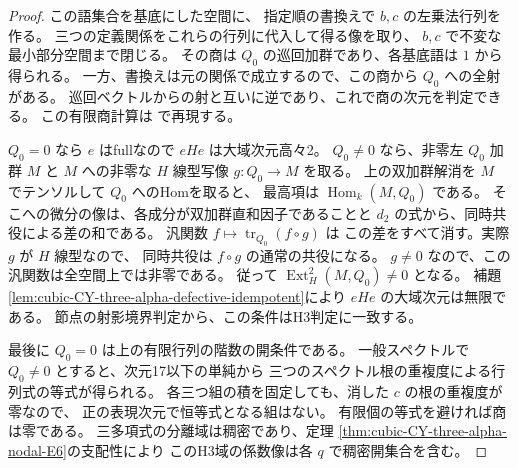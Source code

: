 \begin{proof}
この語集合を基底にした空間に、
指定順の書換えで $b,c$ の左乗法行列を作る。
三つの定義関係をこれらの行列に代入して得る像を取り、
$b,c$ で不変な最小部分空間まで閉じる。
その商は $Q_0$ の巡回加群であり、各基底語は $1$ から得られる。
一方、書換えは元の関係で成立するので、この商から $Q_0$ への全射がある。
巡回ベクトルからの射と互いに逆であり、これで商の次元を判定できる。
この有限商計算は  で再現する。

$Q_0=0$ なら $e$ はfullなので $eHe$ は大域次元高々2。
$Q_0\ne0$ なら、非零左 $Q_0$ 加群 $M$ と $M$ への非零な
$H$ 線型写像 $g:Q_0\to M$ を取る。
上の双加群解消を $M$ でテンソルして $Q_0$ へのHomを取ると、
最高項は $\operatorname{Hom}_k(M,Q_0)$ である。
そこへの微分の像は、各成分が双加群直和因子であることと
$d_2$ の式から、同時共役による差の和である。
汎関数 $f\mapsto\operatorname{tr}_{Q_0}(f\circ g)$ は
この差をすべて消す。実際 $g$ が $H$ 線型なので、
同時共役は $f\circ g$ の通常の共役になる。
$g\ne0$ なので、この汎関数は全空間上では非零である。
従って $\operatorname{Ext}^2_H(M,Q_0)\ne0$ となる。
補題\ref{lem:cubic-CY-three-alpha-defective-idempotent}により
$eHe$ の大域次元は無限である。
節点の射影境界判定から、この条件はH3判定に一致する。

最後に $Q_0=0$ は上の有限行列の階数の開条件である。
一般スペクトルで $Q_0\ne0$ とすると、次元17以下の単純から
三つのスペクトル根の重複度による行列式の等式が得られる。
各三つ組の積を固定しても、消した $c$ の根の重複度が零なので、
正の表現次元で恒等式となる組はない。
有限個の等式を避ければ商は零である。
三多項式の分離域は稠密であり、定理
\ref{thm:cubic-CY-three-alpha-nodal-E6}の支配性により
このH3域の係数像は各 $q$ で稠密開集合を含む。
\end{proof}

